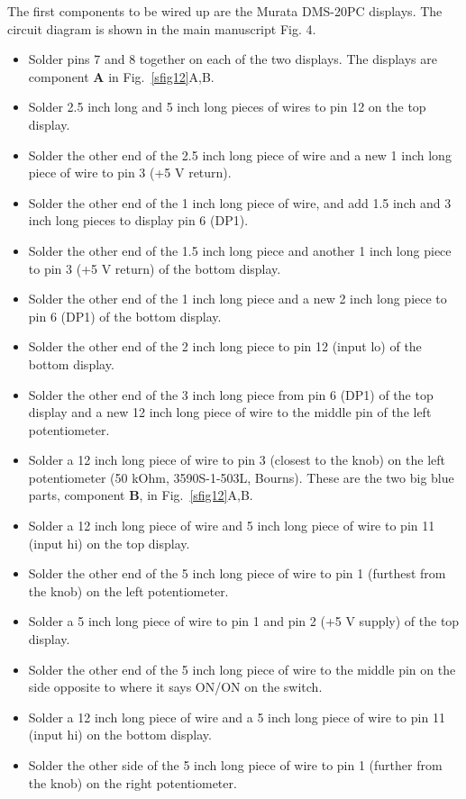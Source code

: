 \documentclass[10pt,letterpaper]{article}
\begin{document}
%
The first components to be wired up are the Murata DMS-20PC displays. The circuit diagram is shown in the main manuscript Fig. 4.
\begin{itemize}
    \item Solder pins 7 and 8 together on each of the two displays. The displays are component \textbf{A} in Fig.~\ref{sfig12}A,B.
    \item Solder 2.5 inch long and 5 inch long pieces of wires to pin 12 on the top display.
    \item Solder the other end of the 2.5 inch long piece of wire and a new 1 inch long piece of wire to pin 3 (+5 V return).
    \item Solder the other end of the 1 inch long piece of wire, and add 1.5 inch and 3 inch long pieces to display pin 6 (DP1).
    \item Solder the other end of the 1.5 inch long piece and another 1 inch long piece to pin 3 (+5 V return) of the bottom display.
    \item Solder the other end of the 1 inch long piece and a new 2 inch long piece to pin 6 (DP1) of the bottom display.
    \item Solder the other end of the 2 inch long piece to pin 12 (input lo) of the bottom display.
    \item Solder the other end of the 3 inch long piece from pin 6 (DP1) of the top display and a new 12 inch long piece of wire to the middle pin of the left potentiometer.
    \item Solder a 12 inch long piece of wire to pin 3 (closest to the knob) on the left potentiometer (50 kOhm, 3590S-1-503L, Bourns). These are the two big blue parts, component \textbf{B}, in Fig.~\ref{sfig12}A,B.
    \item Solder a 12 inch long piece of wire and 5 inch long piece of wire to pin 11 (input hi) on the top display.
    \item Solder the other end of the 5 inch long piece of wire to pin 1 (furthest from the knob) on the left potentiometer.
    \item Solder a 5 inch long piece of wire to pin 1 and pin 2 (+5 V supply) of the top display.
    \item Solder the other end of the 5 inch long piece of wire to the middle pin on the side opposite to where it says ON/ON on the switch.
    \item Solder a 12 inch long piece of wire and a 5 inch long piece of wire to pin 11 (input hi) on the bottom display.
    \item Solder the other side of the 5 inch long piece of wire to pin 1 (further from the knob) on the right potentiometer.

\end{itemize}
\end{document}
